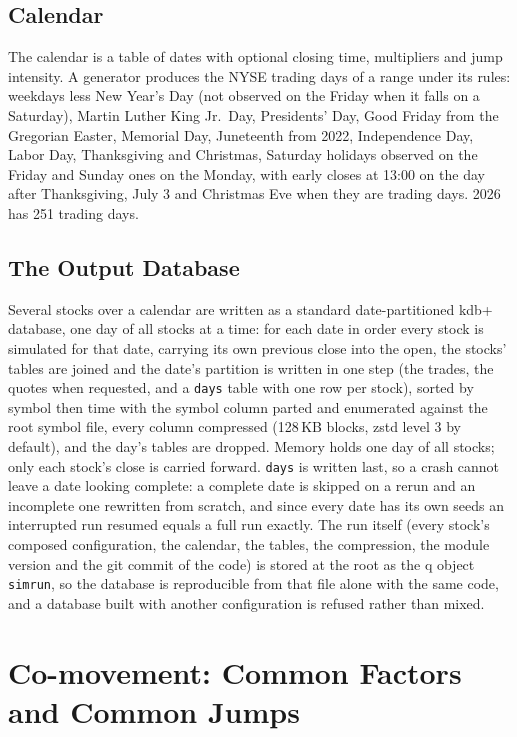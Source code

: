 \documentclass[11pt,a4paper]{article}
\newcommand{\key}[1]{\texttt{#1}}
\theoremstyle{paper}
\begin{document}
\subsection{Calendar}

The calendar is a table of dates with optional closing time, multipliers and jump intensity. A generator produces the NYSE trading days of a range under its rules: weekdays less New Year's Day (not observed on the Friday when it falls on a Saturday), Martin Luther King Jr.\ Day, Presidents' Day, Good Friday from the Gregorian Easter, Memorial Day, Juneteenth from 2022, Independence Day, Labor Day, Thanksgiving and Christmas, Saturday holidays observed on the Friday and Sunday ones on the Monday, with early closes at 13:00 on the day after Thanksgiving, July 3 and Christmas Eve when they are trading days. 2026 has 251 trading days.

\subsection{The Output Database}

Several stocks over a calendar are written as a standard date-partitioned kdb+ database, one day of all stocks at a time: for each date in order every stock is simulated for that date, carrying its own previous close into the open, the stocks' tables are joined and the date's partition is written in one step (the trades, the quotes when requested, and a \key{days} table with one row per stock), sorted by symbol then time with the symbol column parted and enumerated against the root symbol file, every column compressed (128\,KB blocks, zstd level 3 by default), and the day's tables are dropped. Memory holds one day of all stocks; only each stock's close is carried forward. \key{days} is written last, so a crash cannot leave a date looking complete: a complete date is skipped on a rerun and an incomplete one rewritten from scratch, and since every date has its own seeds an interrupted run resumed equals a full run exactly. The run itself (every stock's composed configuration, the calendar, the tables, the compression, the module version and the git commit of the code) is stored at the root as the q object \key{simrun}, so the database is reproducible from that file alone with the same code, and a database built with another configuration is refused rather than mixed.

\section{Co-movement: Common Factors and Common Jumps}\label{sec:comovement}
\end{document}
